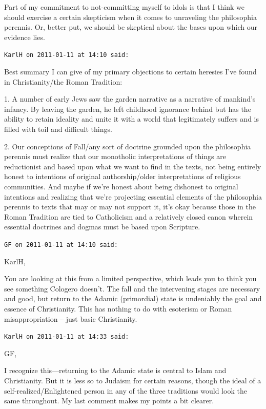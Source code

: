 \begin{footnotesize}
\begin{sffamily}
Part of my commitment to not-committing myself to idols is that I think we should exercise a certain skepticism when it comes to unraveling the philosophia perennis. Or, better put, we should be skeptical about the bases upon which our evidence lies.


\hfill

\texttt{KarlH on 2011-01-11 at 14:10 said: }

Best summary I can give of my primary objections to certain heresies I've found in Christianity/the Roman Tradition:

1. A number of early Jews saw the garden narrative as a narrative of mankind's infancy. By leaving the garden, he left childhood ignorance behind but has the ability to retain ideality and unite it with a world that legitimately suffers and is filled with toil and difficult things.

2. Our conceptions of Fall/any sort of doctrine grounded upon the philosophia perennis must realize that our monotholic interpretations of things are reductionist and based upon what we want to find in the texts, not being entirely honest to intentions of original authorship/older interpretations of religious communities. And maybe if we're honest about being dishonest to original intentions and realizing that we're projecting essential elements of the philosophia perennis to texts that may or may not support it, it's okay because those in the Roman Tradition are tied to Catholicism and a relatively closed canon wherein essential doctrines and dogmas must be based upon Scripture.


\hfill

\texttt{GF on 2011-01-11 at 14:10 said: }

KarlH,

You are looking at this from a limited perspective, which leads you to think you see something Cologero doesn't. The fall and the intervening stages are necessary and good, but return to the Adamic (primordial) state is undeniably the goal and essence of Christianity. This has nothing to do with esoterism or Roman misappropriation – just basic Christianity.


\hfill

\texttt{KarlH on 2011-01-11 at 14:33 said: }

GF,

I recognize this—returning to the Adamic state is central to Islam and Christianity. But it is less so to Judaism for certain reasons, though the ideal of a self-realized/Enlightened person in any of the three traditions would look the same throughout. My last comment makes my points a bit clearer.



\end{sffamily}
\end{footnotesize}
